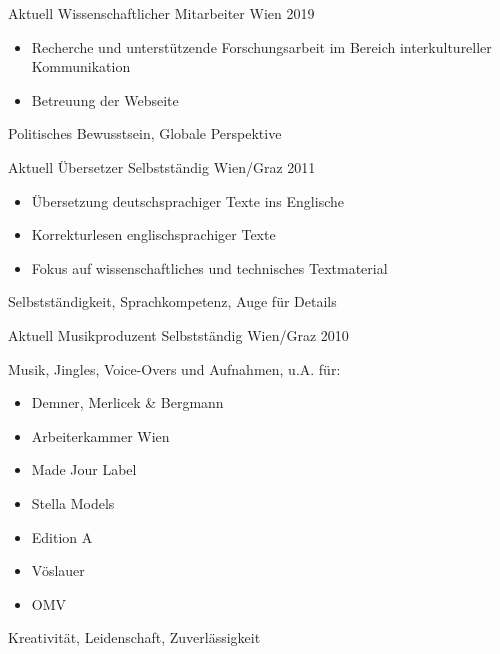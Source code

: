%
%


\begin{experiences}
	\experience
	{Aktuell}
	{Wissenschaftlicher Mitarbeiter}
	{}
	{Wien}
	{2019}
	{
		\begin{itemize}
			\item Recherche und unterstützende Forschungsarbeit im Bereich
			      interkultureller Kommunikation
			\item Betreuung der Webseite
		\end{itemize}
		\smallskip
	}
	{Politisches Bewusstsein, Globale Perspektive}

	\emptySeparator

	\experience
	{Aktuell}
	{Übersetzer}
	{Selbstständig}
	{Wien/Graz}
	{2011}
	{
		\begin{itemize}
			\item Übersetzung deutschsprachiger Texte ins Englische
			\item Korrekturlesen englischsprachiger Texte
			\item Fokus auf wissenschaftliches und technisches Textmaterial
		\end{itemize}
		\smallskip
	}
	{Selbstständigkeit, Sprachkompetenz, Auge für Details}

	\emptySeparator

	\experience
	{Aktuell}
	{Musikproduzent}
	{Selbstständig}
	{Wien/Graz}
	{2010}
	{
		Musik, Jingles, Voice-Overs und Aufnahmen, u.A. für:
		\begin{itemize}
			\item Demner, Merlicek \& Bergmann
			\item Arbeiterkammer Wien
			\item Made Jour Label
			\item Stella Models
			\item Edition A
			\item Vöslauer
			\item OMV
		\end{itemize}
		\smallskip
	}
	{Kreativität, Leidenschaft, Zuverlässigkeit}

	\emptySeparator


\end{experiences}
